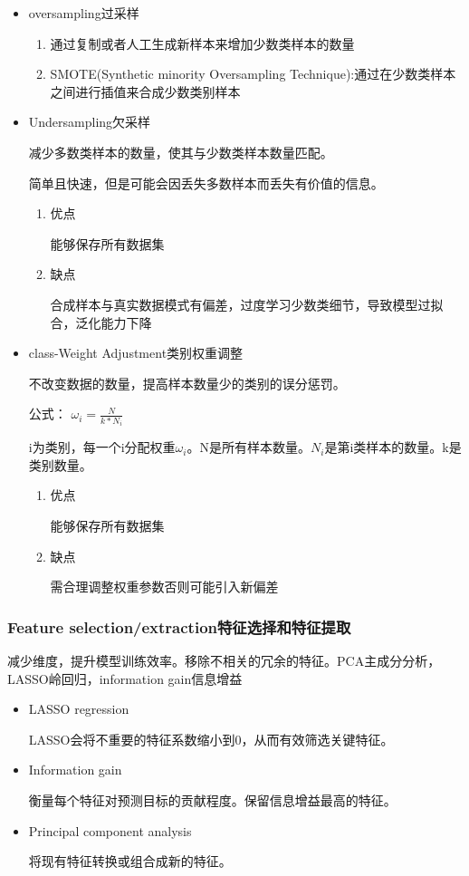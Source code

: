 \documentclass[UTF8]{ctexart}
\begin{document}
\begin{itemize}
    \item oversampling过采样
    \begin{enumerate}
        \item 通过复制或者人工生成新样本来增加少数类样本的数量
        \item SMOTE(Synthetic minority Oversampling Technique):通过在少数类样本之间进行插值来合成少数类别样本
    \end{enumerate}
    \item Undersampling欠采样
    
    减少多数类样本的数量，使其与少数类样本数量匹配。

    简单且快速，但是可能会因丢失多数样本而丢失有价值的信息。
    \begin{enumerate}
        \item 优点
        
        能够保存所有数据集
        \item 缺点
        
        合成样本与真实数据模式有偏差，过度学习少数类细节，导致模型过拟合，泛化能力下降
    \end{enumerate}
    \item class-Weight Adjustment类别权重调整
    
    不改变数据的数量，提高样本数量少的类别的误分惩罚。

    公式：
    $\omega_{i}=\frac{N}{k*N_{i}}$

    i为类别，每一个i分配权重$\omega_{i}$。N是所有样本数量。$N_i$是第i类样本的数量。k是类别数量。

    \begin{enumerate}
        \item 优点
        
        能够保存所有数据集
        \item 缺点
        
        需合理调整权重参数否则可能引入新偏差
    \end{enumerate}
\end{itemize}

\subsubsection{Feature selection/extraction特征选择和特征提取}
减少维度，提升模型训练效率。移除不相关的冗余的特征。PCA主成分分析，LASSO岭回归，information gain信息增益

\begin{itemize}
    \item LASSO regression
    
    LASSO会将不重要的特征系数缩小到0，从而有效筛选关键特征。
    \item Information gain
    
    衡量每个特征对预测目标的贡献程度。保留信息增益最高的特征。
    \item Principal component analysis
    
    将现有特征转换或组合成新的特征。
\end{itemize}
\end{document}
